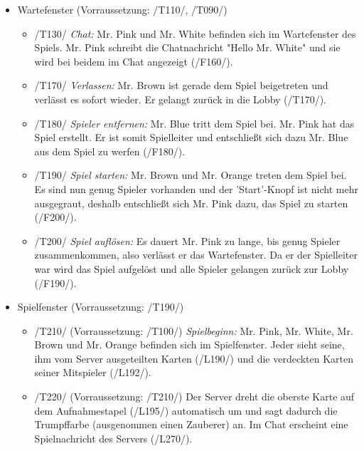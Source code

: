 \documentclass{article}
\begin{document}
\begin{itemize}
\begin{itemize}
	\end{itemize}
	
	\item Wartefenster (Vorraussetzung: /T110/, /T090/)
	
	\begin{itemize}
		
		\item /T130/ \textit{Chat:} Mr. Pink und Mr. White befinden sich im Wartefenster des Spiels. Mr. Pink schreibt die Chatnachricht "Hello Mr. White" und sie wird bei beidem im Chat angezeigt (/F160/).
		
		\item /T170/ \textit{Verlassen:} Mr. Brown ist gerade dem Spiel beigetreten und verlässt es sofort wieder. Er gelangt zurück in die Lobby (/T170/).
		
		\item /T180/ \textit{Spieler entfernen:} Mr. Blue tritt dem Spiel bei. Mr. Pink hat das Spiel erstellt. Er ist somit Spielleiter und entschließt sich dazu Mr. Blue aus dem Spiel zu werfen (/F180/). 
		
		\item /T190/ \textit{Spiel starten:} Mr. Brown und Mr. Orange treten dem Spiel bei. Es sind nun genug Spieler vorhanden und der 'Start'-Knopf ist nicht mehr ausgegraut, deshalb entschließt sich Mr. Pink dazu, das Spiel zu starten (/F200/).
		
		\item /T200/ \textit{Spiel auflösen:} Es dauert Mr. Pink zu lange, bis genug Spieler zusammenkommen, also verlässt er das Wartefenster. Da er der Spielleiter war wird das Spiel aufgelöst und alle Spieler gelangen zurück zur Lobby (/F190/).
		 
	\end{itemize}

	\item Spielfenster (Vorraussetzung: /T190/)
	
	\begin{itemize}
	
		\item /T210/ (Vorraussetzung: /T100/) \textit{Spielbeginn:} Mr. Pink, Mr. White, Mr. Brown und Mr. Orange befinden sich im Spielfenster. Jeder sieht seine, ihm vom Server ausgeteilten Karten (/L190/) und die verdeckten Karten seiner Mitspieler (/L192/).  
		
		\item /T220/ (Vorraussetzung: /T210/)  Der Server dreht die oberste Karte auf dem Aufnahmestapel (/L195/) automatisch um und sagt dadurch die Trumpffarbe (ausgenommen einen Zauberer) an. Im Chat erscheint eine Spielnachricht des Servers (/L270/).
	

\end{itemize}
\end{itemize}
\end{document}
